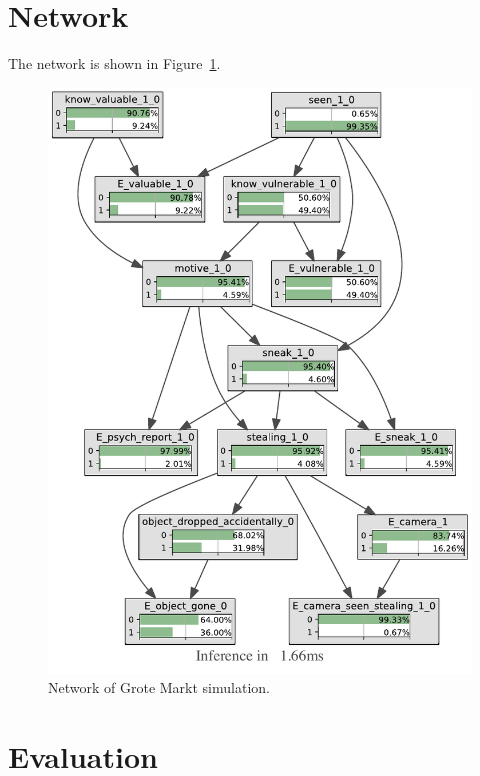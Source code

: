 \section{Network}

The network is shown in Figure~\ref{wedding}.

\begin{figure}
\begin{center}
\includegraphics[width=1.2\linewidth]{../experiments/GroteMarkt/bnImage/BNIMAGEGroteMarkt.pdf}
\caption{Network of Grote Markt simulation.}
\label{wedding}
\end{center}
\end{figure}


\section{Evaluation}



